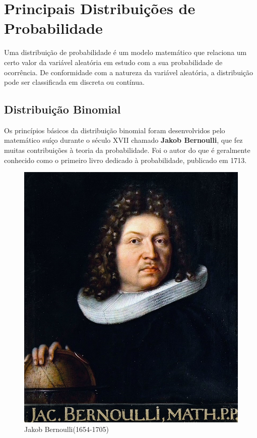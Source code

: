 \newpage
\section{Principais Distribuições de Probabilidade}
 
 
\inic Uma distribuição de probabilidade é um modelo matemático que relaciona um certo valor da variável aleatória em estudo com a sua probabilidade de ocorrência. De conformidade com a natureza da variável aleatória, a distribuição pode ser classificada em discreta ou contínua.
 
\subsection{Distribuição Binomial}

Os princípios básicos da distribuição binomial foram desenvolvidos pelo matemático suíço durante o século XVII chamado \textbf{Jakob Bernoulli}, que fez muitas contribuições à teoria da probabilidade. Foi o autor do que é geralmente conhecido como o primeiro livro dedicado à probabilidade, publicado em 1713.

\vspace{-1.68cm}
\begin{figure}
    \centering
\includegraphics[scale=0.2]{figures/Jakob_Bernoulli.jpeg}
    \caption{Jakob Bernoulli(1654-1705)}
    \label{fig:my_label4}
\end{figure}

